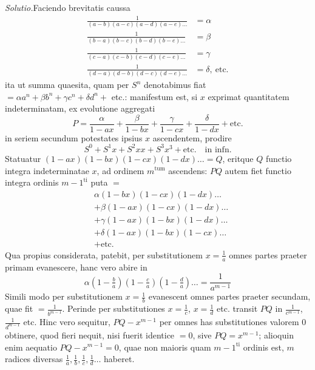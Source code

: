 \textit{Solutio.}\quad Faciendo brevitatis caussa
\[
\begin{aligned}
\frac1{(a-b)(a-c)(a-d)(a-e)\ldots}&=\alpha\\
\frac1{(b-a)(b-c)(b-d)(b-e)\ldots}&=\beta\\
\frac1{(c-a)(c-b)(c-d)(c-e)\ldots}&=\gamma\\
\frac1{(d-a)(d-b)(d-c)(d-e)\ldots}&=\delta,\ \text{etc.}
\end{aligned}
\]
ita ut summa quaesita, quam per $S^n$ denotabimus fiat $=\alpha a^n+\beta b^n+\gamma c^n+\delta d^n+$ etc.: manifestum est, si $x$ exprimat quantitatem indeterminatam, ex evolutione aggregati
\[
P=\frac\alpha{1-ax}+\frac\beta{1-bx}+\frac\gamma{1-cx}+\frac\delta{1-dx}+\text{etc.}
\]
in seriem secundum potestates ipsius $x$ ascendentem, prodire
\[
S^0+S^1x+S^2xx+S^3x^3+\text{etc.}\quad\text{in infn.}
\]
Statuatur $(1-ax)(1-bx)(1-cx)(1-dx)\ldots=Q$, eritque $Q$ functio integra indeterminatae $x$, ad ordinem $m^{\mathrm{tum}}$ ascendens: $PQ$ autem fiet functio integra ordinis $m-1^{\mathrm{ti}}$ puta $=$
\[
\begin{aligned}
&\alpha(1-bx)(1-cx)(1-dx)\ldots\\
&+\beta(1-ax)(1-cx)(1-dx)\ldots\\
&+\gamma(1-ax)(1-bx)(1-dx)\ldots\\
&+\delta(1-ax)(1-bx)(1-cx)\ldots\\
&+\text{etc.}
\end{aligned}
\]
Qua propius considerata, patebit, per substitutionem $x=\frac1a$ omnes partes praeter primam evanescere, hanc vero abire in
\[
\alpha(1-\tfrac ba)(1-\tfrac ca)(1-\tfrac da)\ldots=\frac1{a^{m-1}}
\]
Simili modo per substitutionem $x=\frac1b$ evanescent omnes partes praeter secundam, quae fit $=\frac1{b^{m-1}}$. Perinde per substitutiones $x=\frac1c$, $x=\frac1d$ etc. transit $PQ$ in $\frac1{c^{m-1}}$, $\frac1{d^{m-1}}$ etc. Hinc vero sequitur, $PQ-x^{m-1}$ per omnes has substitutiones valorem 0 obtinere, quod fieri nequit, nisi fuerit identice $=0$, sive $PQ=x^{m-1}$; alioquin enim aequatio $PQ-x^{m-1}=0$, quae non maioris quam $m-1^{\mathrm{ti}}$ ordinis est, $m$ radices diversas $\frac1a,\frac1b,\frac1c,\frac1d\ldots$ haberet.

